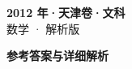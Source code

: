\documentclass[zihao=-4, a4paper]{ctexart}
\begin{document}
\begin{center}
  {\Large\bfseries 2012 年·天津卷·文科}\\[4pt]
  {\large 数学 · 解析版}
\end{center}
\medskip
{}

\clearpage
{}
\begin{center}{\Large\bfseries 参考答案与详细解析}\end{center}
\medskip

\end{document}
